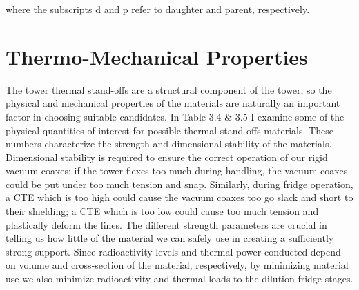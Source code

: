 \documentclass{report}
\begin{document}
where the subscripts d and p refer to daughter and parent, respectively.



\section{Thermo-Mechanical Properties}

The tower thermal stand-offs are a structural component of the tower, so the physical and mechanical properties of the materials are naturally an important factor in choosing suitable candidates. In Table 3.4 \& 3.5 I examine some of the physical quantities of interest for possible thermal stand-offs materials. These numbers characterize the strength and dimensional stability of the materials. Dimensional stability is required to ensure the correct operation of our rigid vacuum coaxes; if the tower flexes too much during handling, the vacuum coaxes could be put under too much tension and snap. Similarly, during fridge operation, a CTE which is too high could cause the vacuum coaxes too go slack and short to their shielding; a CTE which is too low could cause too much tension and plastically deform the lines. The different strength parameters are crucial in telling us how little of the material we can safely use in creating a sufficiently strong support. Since radioactivity levels and thermal power conducted depend on volume and cross-section of the material, respectively, by minimizing material use we also minimize radioactivity and thermal loads to the dilution fridge stages.
\end{document}
